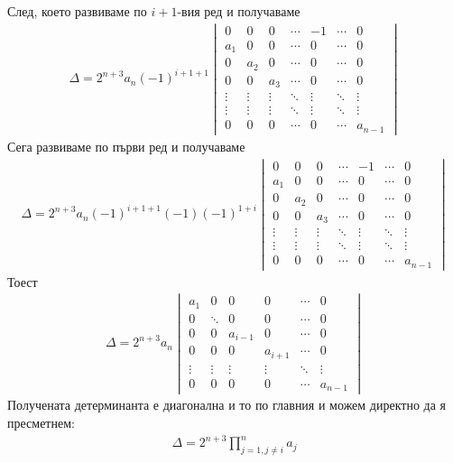 \documentclass[a4paper, 12pt, oneside]{article}
\begin{document}
След, което развиваме по \(i + 1\)-вия ред и получаваме
\begin{align*}
\Delta = 2^{n + 3}a_n(-1)^{i + 1 + 1}\begin{vmatrix}
    0      & 0      & 0      & \cdots & -1     & \cdots & 0      \\
    a_1    & 0      & 0      & \cdots & 0      & \cdots & 0      \\
    0      & a_2    & 0      & \cdots & 0      & \cdots & 0      \\
    0      & 0      & a_3    & \cdots & 0      & \cdots & 0      \\
    \vdots & \vdots & \vdots & \ddots & \vdots & \ddots & \vdots \\
    \vdots & \vdots & \vdots & \ddots & \vdots & \ddots & \vdots \\
    0      & 0      & 0      & \cdots & 0      & \cdots & a_{n - 1}
\end{vmatrix}
\end{align*}
Сега развиваме по първи ред и получаваме
\begin{align*}
\Delta = 2^{n + 3}a_n(-1)^{i + 1 + 1}(-1)(-1)^{1 + i}\begin{vmatrix}
    0      & 0      & 0      & \cdots & -1     & \cdots & 0      \\
    a_1    & 0      & 0      & \cdots & 0      & \cdots & 0      \\
    0      & a_2    & 0      & \cdots & 0      & \cdots & 0      \\
    0      & 0      & a_3    & \cdots & 0      & \cdots & 0      \\
    \vdots & \vdots & \vdots & \ddots & \vdots & \ddots & \vdots \\
    \vdots & \vdots & \vdots & \ddots & \vdots & \ddots & \vdots \\
    0      & 0      & 0      & \cdots & 0      & \cdots & a_{n - 1}
\end{vmatrix}
\end{align*}
Тоест
\begin{align*}
\Delta = 2^{n + 3}a_n\begin{vmatrix}
    a_1 & 0 & 0 & 0 & \cdots & 0 \\
    0 & \ddots & 0 & 0 & \cdots & 0 \\
    0 & 0 & a_{i - 1} & 0 & \cdots & 0 \\
    0 & 0 & 0 & a_{i + 1} & \cdots & 0 \\
    \vdots & \vdots & \vdots & \vdots & \ddots & \vdots \\
    0 & 0 & 0 & 0 & \cdots & a_{n - 1}
\end{vmatrix}
\end{align*}
Получената детерминанта е диагонална и то по главния и можем директно да я пресметнем:
\begin{align*}
\Delta = 2^{n + 3}\displaystyle\prod_{j = 1, j \neq i}^n a_j
\end{align*}
\end{document}

